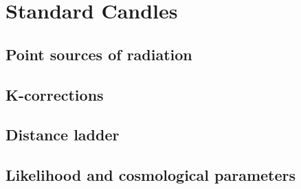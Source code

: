 \chapter{Standard Candles}


\section{Point sources of radiation}



\section{K-corrections}



\section{Distance ladder}



\section{Likelihood and cosmological parameters}
 
